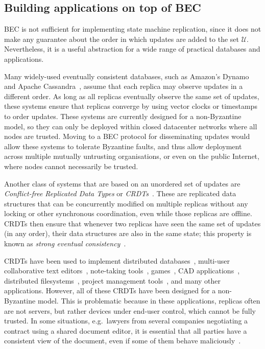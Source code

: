 \documentclass[a4paper,anonymous,USenglish]{lipics-v2019}
\begin{document}
\subsection{Building applications on top of BEC}\label{sec:applications}

BEC is not sufficient for implementing state machine replication, since it does not make any guarantee about the order in which updates are added to the set $\mathcal{U}$.
Nevertheless, it is a useful abstraction for a wide range of practical databases and applications.

Many widely-used eventually consistent databases, such as Amazon's Dynamo~\cite{DeCandia:2007ui} and Apache Cassandra~\cite{Lakshman:2009tz}, assume that each replica may observe updates in a different order.
As long as all replicas eventually observe the same set of updates, these systems ensure that replicas converge by using vector clocks or timestamps to order updates.
These systems are currently designed for a non-Byzantine model, so they can only be deployed within closed datacenter networks where all nodes are trusted.
Moving to a BEC protocol for disseminating updates would allow these systems to tolerate Byzantine faults, and thus allow deployment across multiple mutually untrusting organisations, or even on the public Internet, where nodes cannot necessarily be trusted.

Another class of systems that are based on an unordered set of updates are \emph{Conflict-free Replicated Data Types} or \emph{CRDTs}~\cite{Preguica:2018gi,Shapiro:2011}.
These are replicated data structures that can be concurrently modified on multiple replicas without any locking or other synchronous coordination, even while those replicas are offline.
CRDTs then ensure that whenever two replicas have seen the same set of updates (in any order), their data structures are also in the same state; this property is known as \emph{strong eventual consistency}~\cite{Gomes:2017gy,Shapiro:2011}.

CRDTs have been used to implement distributed databases~\cite{Akkoorath2016Cure,Brown2016bigsets,Zawirski2015SwiftCloud}, multi-user collaborative text editors~\cite{AhmedNacer:2011ke,Nedelec:2016eo,Weiss:2009ht}, note-taking tools~\cite{vanHardenberg2020PushPin}, games~\cite{vanderLinde:2017fu}, CAD applications~\cite{Lv:2018ie}, distributed filesystems~\cite{Najafzadeh:2018bw,Tao:2015gd}, project management tools~\cite{Kleppmann2019localfirst}, and many other applications.
However, all of these CRDTs have been designed for a non-Byzantine model.
This is problematic because in these applications, replicas often are not servers, but rather devices under end-user control, which cannot be fully trusted.
In some situations, e.g.\ lawyers from several companies negotiating a contract using a shared document editor, it is essential that all parties have a consistent view of the document, even if some of them behave maliciously~\cite{Kollmann:2019hf}.
\end{document}
